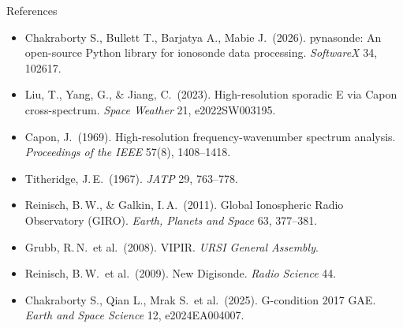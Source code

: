 \documentclass[aspectratio=169,11pt]{beamer}
\begin{document}
\begin{frame}[allowframebreaks]{References}
  \footnotesize
  \begin{itemize}
    \item Chakraborty S., Bullett T., Barjatya A., Mabie J.\ (2026).
          pynasonde: An open-source Python library for ionosonde data processing.
          \textit{SoftwareX} 34, 102617.
    \item Liu, T., Yang, G., \& Jiang, C.\ (2023). High-resolution sporadic E
          via Capon cross-spectrum. \textit{Space Weather} 21, e2022SW003195.
    \item Capon, J.\ (1969). High-resolution frequency-wavenumber spectrum
          analysis. \textit{Proceedings of the IEEE} 57(8), 1408--1418.
    \item Titheridge, J.\,E.\ (1967). \textit{JATP} 29, 763--778.
    \item Reinisch, B.\,W., \& Galkin, I.\,A.\ (2011). Global Ionospheric Radio
          Observatory (GIRO). \textit{Earth, Planets and Space} 63, 377--381.
    \item Grubb, R.\,N.\ et al.\ (2008). VIPIR. \textit{URSI General Assembly}.
    \item Reinisch, B.\,W.\ et al.\ (2009). New Digisonde. \textit{Radio Science} 44.
    \item Chakraborty S., Qian L., Mrak S.\ et al.\ (2025). G-condition 2017 GAE.
          \textit{Earth and Space Science} 12, e2024EA004007.
  \end{itemize}
\end{frame}
\end{document}
